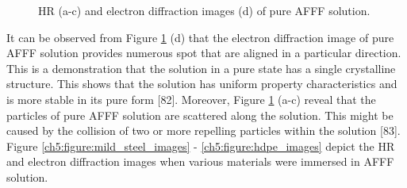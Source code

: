 \documentclass[12pt]{report}
\begin{document}
\begin{figure}[H]
\caption{HR (a-c) and electron diffraction images (d) of pure AFFF solution.}
\label{ch5:figure:pure_afff_images}
\end{figure}

It can be observed from Figure \ref{ch5:figure:pure_afff_images} (d) that the electron diffraction image of pure AFFF solution provides numerous spot that are aligned in a particular direction. This is a demonstration that the solution in a pure state has a single crystalline structure. This shows that the solution has uniform property characteristics and is more stable in its pure form [82].  Moreover, Figure \ref{ch5:figure:pure_afff_images} (a-c) reveal that the particles of pure AFFF solution are scattered along the solution. This might be caused by the collision of two or more repelling particles within the solution [83]. Figure \ref{ch5:figure:mild_steel_images} - \ref{ch5:figure:hdpe_images} depict the HR and electron diffraction images when various materials were immersed in AFFF solution. 
  
\end{document}
